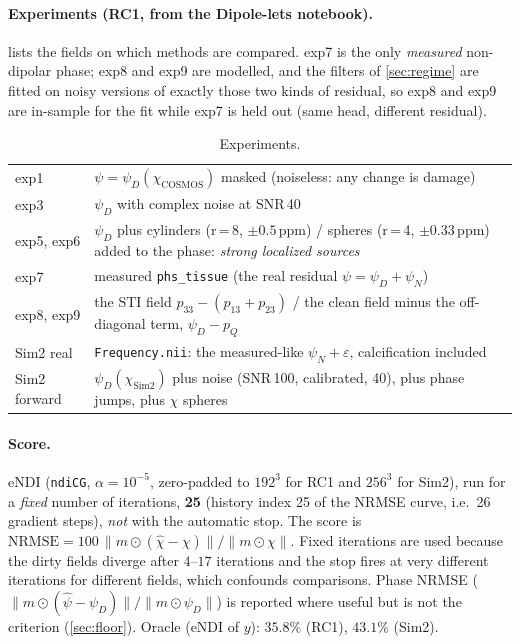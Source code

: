 \documentclass[11pt]{article}
\newcommand{\norm}[1]{\lVert #1\rVert}
\newcommand{\code}[1]{\texttt{#1}}
\begin{document}
\paragraph{Experiments (RC1, from the Dipole-lets notebook).}
 lists the fields on which methods are compared. exp7 is the only \emph{measured} non-dipolar phase; exp8 and exp9 are modelled, and the filters of \cref{sec:regime} are fitted on noisy versions of exactly those two kinds of residual, so exp8 and exp9 are in-sample for the fit while exp7 is held out (same head, different residual).
\begin{table}[h]\centering\small
\begin{tabular}{@{}lp{12.2cm}@{}}
\toprule
exp1 & $\psi=\psi_D(\chi_{\mathrm{COSMOS}})$ masked (noiseless: any change is damage)\\
exp3 & $\psi_D$ with complex noise at SNR\,40 \\
exp5, exp6 & $\psi_D$ plus cylinders (r\,=\,8, $\pm0.5$\,ppm) / spheres (r\,=\,4, $\pm0.33$\,ppm) added to the phase: \emph{strong localized sources} \\
exp7 & measured \code{phs\_tissue} (the real residual $\psi=\psi_D+\psi_N$) \\
exp8, exp9 & the STI field $p_{33}-(p_{13}+p_{23})$ / the clean field minus the off-diagonal term, $\psi_D-p_Q$ \\
Sim2 real & \code{Frequency.nii}: the measured-like $\psi_N+\varepsilon$, calcification included \\
Sim2 forward & $\psi_D(\chi_{\mathrm{Sim2}})$ plus noise (SNR\,100, calibrated, 40), plus phase jumps, plus $\chi$ spheres \\
\bottomrule
\end{tabular}
\caption{Experiments.}\label{tab:exps}
\end{table}

\paragraph{Score.} eNDI (\code{ndiCG}, $\alpha=10^{-5}$, zero-padded to $192^3$ for RC1 and $256^3$ for Sim2), run for a \emph{fixed} number of iterations, \textbf{25} (history index 25 of the NRMSE curve, i.e.\ 26 gradient steps), \emph{not} with the automatic stop. The score is $\mathrm{NRMSE}=100\,\norm{m\odot(\hat\chi-\chi)}/\norm{m\odot\chi}$. Fixed iterations are used because the dirty fields diverge after $4$--$17$ iterations and the stop fires at very different iterations for different fields, which confounds comparisons. Phase NRMSE ($\norm{m\odot(\hat\psi-\psi_D)}/\norm{m\odot\psi_D}$) is reported where useful but is not the criterion (\cref{sec:floor}). Oracle (eNDI of $y$): $35.8\%$ (RC1), $43.1\%$ (Sim2).
\end{document}
